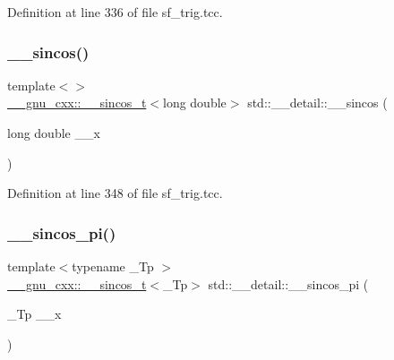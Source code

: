 Definition at line 336 of file sf\+\_\+trig.\+tcc.

\mbox{\label{namespacestd_1_1____detail_aade98e6318f4459f37e1f79f4c871cf6}} 
\subsubsection{\texorpdfstring{\+\_\+\+\_\+sincos()}{\_\_sincos()}\hspace{0.1cm}{\footnotesize\ttfamily [4/4]}}
{\footnotesize\ttfamily template$<$$>$ \\
\hyperlink{struct____gnu__cxx_1_1____sincos__t}{\+\_\+\+\_\+gnu\+\_\+cxx\+::\+\_\+\+\_\+sincos\+\_\+t}$<$long double$>$ std\+::\+\_\+\+\_\+detail\+::\+\_\+\+\_\+sincos (\begin{DoxyParamCaption}\item[{long double}]{\+\_\+\+\_\+x }\end{DoxyParamCaption})\hspace{0.3cm}{\ttfamily [inline]}}



Definition at line 348 of file sf\+\_\+trig.\+tcc.

\mbox{\label{namespacestd_1_1____detail_af17af8caca5ba47597cc314e93ba49cd}} 
\subsubsection{\texorpdfstring{\+\_\+\+\_\+sincos\+\_\+pi()}{\_\_sincos\_pi()}}
{\footnotesize\ttfamily template$<$typename \+\_\+\+Tp $>$ \\
\hyperlink{struct____gnu__cxx_1_1____sincos__t}{\+\_\+\+\_\+gnu\+\_\+cxx\+::\+\_\+\+\_\+sincos\+\_\+t}$<$\+\_\+\+Tp$>$ std\+::\+\_\+\+\_\+detail\+::\+\_\+\+\_\+sincos\+\_\+pi (\begin{DoxyParamCaption}\item[{\+\_\+\+Tp}]{\+\_\+\+\_\+x }\end{DoxyParamCaption})}

